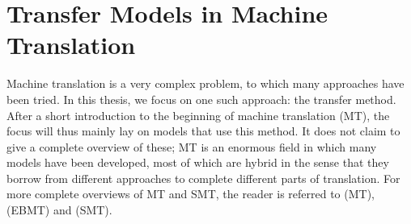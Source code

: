 \documentclass{report}
\theoremstyle{definition}
\theoremstyle{plain}
\begin{document}

\chapter{Transfer Models in Machine Translation}



Machine translation is a very complex problem, to which many approaches have been tried. In this thesis, we focus on one such approach: the transfer method.   After a short introduction to the beginning of machine translation (MT), the focus will thus mainly lay on models that use this method. It does not claim to give a complete overview of these; MT is an enormous field in which many models have been developed, most of which are hybrid in the sense that they borrow from different approaches to complete different parts of translation. For more complete overviews of MT and SMT, the reader is referred to \cite{hutchins1992introduction} (MT), \cite{somers1999review} (EBMT) and \cite{koehn2008statistical} (SMT).
\end{document}
